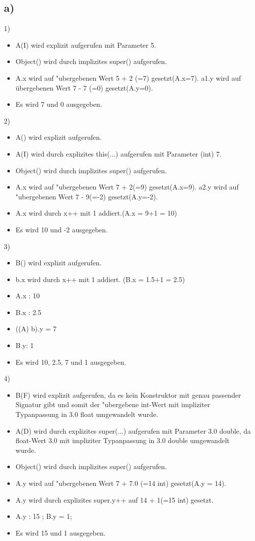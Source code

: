 \documentclass[a4paper,11pt]{scrartcl}
\begin{document}
\subsection*{a)}
	1)
	\begin{itemize}
		\item A(I) wird explizit aufgerufen mit Parameter 5.
		\item Object() wird durch implizites super() aufgerufen.
		\item A.x wird auf "ubergebenen Wert 5 + 2 (=7) gesetzt(A.x=7). a1.y wird auf übergebenen Wert 7 - 7 (=0) gesetzt(A.y=0).
		\item Es wird 7 und 0 ausgegeben.
	\end{itemize}
	2)
	\begin{itemize}
		\item A() wird explizit aufgerufen.
		\item A(I) wird durch explizites this(...) aufgerufen mit Parameter (int) 7.
		\item Object() wird durch implizites super() aufgerufen.
		\item A.x wird auf "ubergebenen Wert 7 + 2(=9) gesetzt(A.x=9). a2.y wird auf "ubergebenen Wert 7 - 9(=-2) gesetzt(A.y=-2).
		\item A.x wird durch x++ mit 1 addiert.(A.x = 9+1 = 10)
		\item Es wird 10 und -2 ausgegeben.
	\end{itemize}
	3)
	\begin{itemize}
		\item B() wird explizit aufgerufen.
		\item b.x wird durch x++ mit 1 addiert. (B.x = 1.5+1 = 2.5)
		\item A.x : 10
		\item B.x : 2.5
		\item ((A) b).y = 7
		\item B.y: 1
		\item Es wird 10, 2.5, 7 und 1 ausgegeben.
	\end{itemize}
	4)
	\begin{itemize}
		\item B(F) wird explizit aufgerufen, da es kein Konstruktor mit genau passender Signatur gibt und somit der "ubergebene int-Wert mit impliziter Typanpassung in 3.0 float umgewandelt wurde.
		\item A(D) wird durch explizites super(...) aufgerufen mit Parameter 3.0 double, da float-Wert 3.0 mit impliziter Typanpassung in 3.0 double umgewandelt wurde.
		\item Object() wird durch implizites super() aufgerufen.  
		\item A.y wird auf "ubergebenen Wert 7 + 7.0 (=14 int) gesetzt(A.y = 14).
		\item A.y wird durch explizites super.y++ auf 14 + 1(=15 int) gesetzt.
		\item A.y : 15 ; B.y = 1;
		\item Es wird 15 und 1 ausgegeben.
	\end{itemize}
\end{document}
